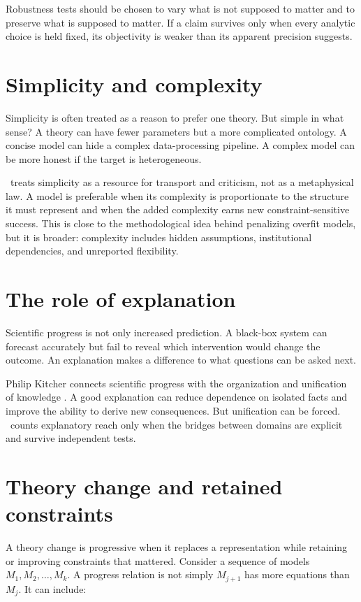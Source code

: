 Robustness tests should be chosen to vary what is not supposed to matter and
to preserve what is supposed to matter. If a claim survives only when every
analytic choice is held fixed, its objectivity is weaker than its apparent
precision suggests.

\section{Simplicity and complexity}

Simplicity is often treated as a reason to prefer one theory. But simple in
what sense? A theory can have fewer parameters but a more complicated
ontology. A concise model can hide a complex data-processing pipeline. A
complex model can be more honest if the target is heterogeneous.

\RCR\ treats simplicity as a resource for transport and criticism, not as a
metaphysical law. A model is preferable when its complexity is proportionate
to the structure it must represent and when the added complexity earns new
constraint-sensitive success. This is close to the methodological idea behind
penalizing overfit models, but it is broader: complexity includes hidden
assumptions, institutional dependencies, and unreported flexibility.

\section{The role of explanation}

Scientific progress is not only increased prediction. A black-box system can
forecast accurately but fail to reveal which intervention would change the
outcome. An explanation makes a difference to what questions can be asked next.

Philip Kitcher connects scientific progress with the organization and
unification of knowledge \citep{kitcher1993}. A good explanation can reduce
dependence on isolated facts and improve the ability to derive new consequences.
But unification can be forced. \RCR\ counts explanatory reach only when the
bridges between domains are explicit and survive independent tests.

\section{Theory change and retained constraints}

A theory change is progressive when it replaces a representation while
retaining or improving constraints that mattered. Consider a sequence of
models \(M_1,M_2,\ldots,M_k\). A progress relation is not simply
\(M_{j+1}\) has more equations than \(M_j\). It can include:

